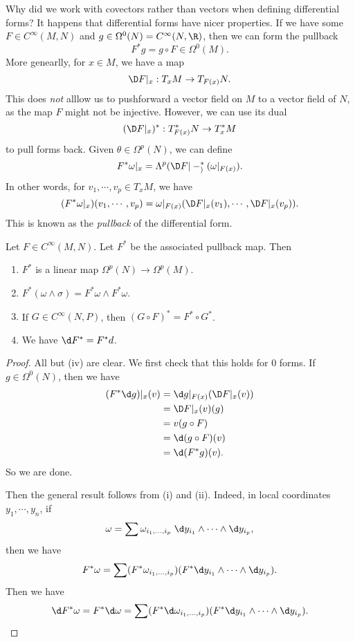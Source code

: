 \documentclass[a4paper]{article}
\begin{document}
Why did we work with covectors rather than vectors when defining differential forms? It happens that differential forms have nicer properties. If we have some $F \in C^\infty(M, N)$ and $g \in \Omega^0(N) = C^{\infty}(N, \R)$, then we can form the pullback
\[
  F^*g = g \circ F \in \Omega^0(M).
\]
More genearlly, for $x \in M$, we have a map
\[
  \D F|_x : T_x M \to T_{F(x)}N.
\]
This does \emph{not} alllow us to pushforward a vector field on $M$ to a vector field of $N$, as the map $F$ might not be injective. However, we can use its dual
\[
  (\D F|_x)^*: T_{F(x)}^* N \to T_x^* M
\]
to pull forms back. Given $\theta \in \Omega^p(N)$, we can define
\[
  F^* \omega|_x = \Lambda^p(\D F|-_)^*(\omega|_{F(x)}).
\]
In other words, for $v_1, \cdots, v_p \in T_x M$, we have
\[
  (F^*\omega|_x)(v_1, \cdots, v_p) = \omega|_{F(x)} (\D F|_x(v_1), \cdots, \D F|_x(v_p)).
\]
This is known as the \emph{pullback} of the differential form.
\begin{lemma}
  Let $F \in C^\infty(M, N)$. Let $F^*$ be the associated pullback map. Then
  \begin{enumerate}
    \item $F^*$ is a linear map $\Omega^p(N) \to \Omega^p(M)$.
    \item $F^*(\omega \wedge \sigma) = F^*\omega \wedge F^*\omega$.
    \item If $G \in C^\infty (N, P)$, then $(G \circ F)^* = F^* \circ G^*$.
    \item We have $\d F^* = F^* d$.
  \end{enumerate}
\end{lemma}

\begin{proof}
  All but (iv) are clear. We first check that this holds for $0$ forms. If $g \in \Omega^0(N)$, then we have
  \begin{align*}
    (F^* \d g)|_x(v) &= \d g|_{F(x)} (\D F|_x (v)) \\
    &= \D F|_x(v)(g) \\
    &= v(g \circ F) \\
    &= \d (g \circ F)(v) \\
    &= \d (F^* g)(v).
  \end{align*}
  So we are done.

  Then the general result follows from (i) and (ii). Indeed, in local coordinates $y_1, \cdots, y_n$, if
  \[
    \omega = \sum\omega_{i_1, \ldots, i_p}\; \d y_{i_1} \wedge \cdots \wedge \d y_{i_p},
  \]
  then we have
  \[
    F^* \omega = \sum (F^* \omega_{i_1, \ldots, i_p}) (F^* \d y_{i_1} \wedge \cdots \wedge \d y_{i_p}).
  \]
  Then we have
  \[
    \d F^* \omega = F^* \d \omega = \sum (F^* \d \omega_{i_1, \ldots, i_p}) (F^* \d y_{i_1} \wedge \cdots \wedge \d y_{i_p}).
  \]
\end{proof}
\end{document}
